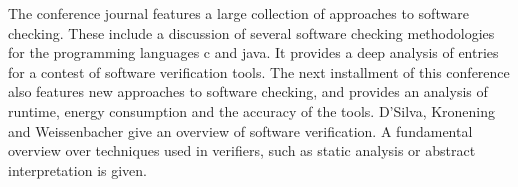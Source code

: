 The conference journal \citep{10.1007/978-3-030-17502-3_9} features a large collection of approaches to software checking. These include a discussion of several software checking methodologies for the programming languages c and java. It provides a deep analysis of entries for a contest of software verification tools.
The next installment of this conference \citep{10.1007/978-3-030-45237-7_21} also features new approaches to software checking, and provides an analysis of runtime, energy consumption and the accuracy of the tools. 
D'Silva, Kronening and Weissenbacher\citep{survey-sv} give an overview of software verification. A fundamental overview over techniques used in verifiers, such as static analysis or abstract interpretation is given. 